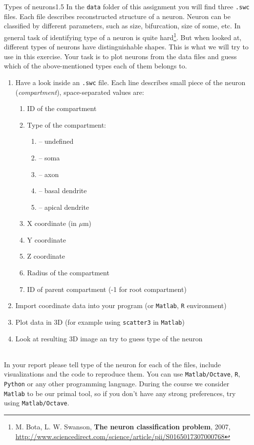 \documentclass[a4paper,11pt]{article}
\begin{document}
\begin{exercise}{3}{Types of neurons}{1.5}
In the \texttt{data} folder of this assignment you will find three \texttt{.swc} files. Each file describes reconstructed structure of a neuron. Neuron can be classified by different parameters, such as size, bifurcation, size of some, etc. In general task of identifying type of a neuron is quite hard\footnote{M. Bota, L. W. Swanson, \textbf{The neuron classification problem}, 2007, 
\url{http://www.sciencedirect.com/science/article/pii/S0165017307000768}}. But when looked at, different types of neurons have distinguishable shapes. This is what we will try to use in this exercise. Your task is to plot neurons from the data files and guess which of the above-mentioned types each of them belongs to.
\begin{enumerate}
	\item Have a look inside an \texttt{.swc} file. Each line describes small piece of the neuron (\emph{compartment}), space-separated values are: 
	\begin{enumerate}
		\item ID of the compartment
		\item Type of the compartment:
		\begin{enumerate}
			\item[0] -- undefined
			\item[1] -- soma
			\item[2] -- axon
			\item[3] -- basal dendrite
			\item[4] -- apical dendrite
		\end{enumerate}
		\item X coordinate (in $\mu$m)
		\item Y coordinate
		\item Z coordinate	
		\item Radius of the compartment
		\item ID of parent compartment (-1 for root compartment)
	\end{enumerate}
	\item Import coordinate data into your program (or \texttt{Matlab}, \texttt{R} environment)
	\item Plot data in 3D (for example using \texttt{scatter3} in \texttt{Matlab})
	\item Look at resulting 3D image an try to guess type of the neuron
\end{enumerate}
\ \\
In your report please tell type of the neuron for each of the files, include visualizations and the code to reproduce them. You can use \texttt{Matlab/Octave}, \texttt{R}, \texttt{Python} or any other programming language. During the course we consider \texttt{Matlab} to be our primal tool, so if you don't have any strong preferences, try using \texttt{Matlab/Octave}.
\end{exercise}
\pagebreak
\end{document}
